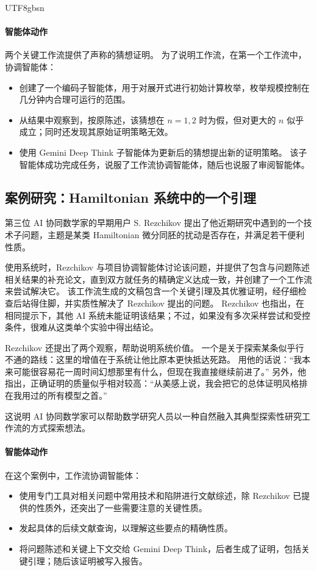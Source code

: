 \documentclass[11pt, a4paper, copyright, gdm]{google}
\begin{document}
\begin{CJK*}{UTF8}{gbsn}
\paragraph{智能体动作}

两个关键工作流提供了声称的猜想证明。
为了说明工作流，在第一个工作流中，协调智能体：
\begin{itemize}
     \item 创建了一个编码子智能体，用于对展开式进行初始计算枚举，枚举规模控制在几分钟内合理可运行的范围。
     \item 从结果中观察到，按原陈述，该猜想在 $n = 1, 2$ 时为假，但对更大的 $n$ 似乎成立；同时还发现其原始证明策略无效。
     \item 使用 Gemini Deep Think 子智能体为更新后的猜想提出新的证明策略。
     该子智能体成功完成任务，说服了工作流协调智能体，随后也说服了审阅智能体。
\end{itemize}



\subsection{案例研究：Hamiltonian 系统中的一个引理}

第三位 AI 协同数学家的早期用户 S. Rezchikov 提出了他近期研究中遇到的一个技术子问题，主题是某类 Hamiltonian 微分同胚的扰动是否存在，并满足若干便利性质。

使用系统时，Rezchikov 与项目协调智能体讨论该问题，并提供了包含与问题陈述相关结果的补充论文，直到双方就任务的精确定义达成一致，并创建了一个工作流来尝试解决它。
该工作流生成的文稿包含一个关键引理及其优雅证明，经仔细检查后站得住脚，并实质性解决了 Rezchikov 提出的问题。
Rezchikov 也指出，在相同提示下，其他 AI 系统未能证明该结果；不过，如果没有多次采样尝试和受控条件，很难从这类单个实验中得出结论。

Rezchikov 还提出了两个观察，帮助说明系统价值。
一个是关于探索某条似乎行不通的路线：这里的增值在于系统让他比原本更快抵达死路。
用他的话说：“我本来可能很容易花一周时间幻想那里有什么，但现在我直接继续前进了。”
另外，他指出，正确证明的质量似乎相对较高：“从美感上说，我会把它的总体证明风格排在我用过的所有模型之首。”

这说明 AI 协同数学家可以帮助数学研究人员以一种自然融入其典型探索性研究工作流的方式探索想法。

\paragraph{智能体动作}

在这个案例中，工作流协调智能体：
\begin{itemize}
    \item 使用专门工具对相关问题中常用技术和陷阱进行文献综述，除 Rezchikov 已提供的性质外，还突出了一些需要注意的关键性质。
    \item 发起具体的后续文献查询，以理解这些要点的精确性质。
    \item 将问题陈述和关键上下文交给 Gemini Deep Think，后者生成了证明，包括关键引理；随后该证明被写入报告。
\end{itemize}



\end{CJK*}
\end{document}

